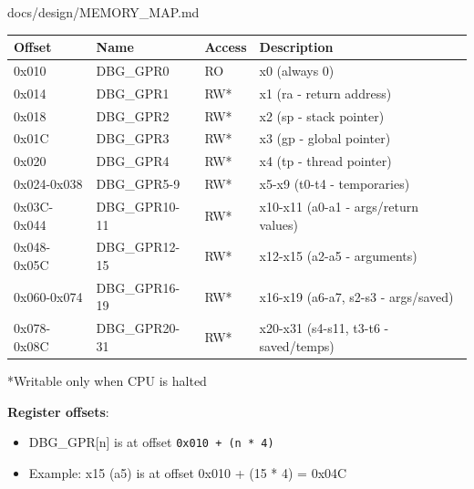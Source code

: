 \begin{relocated}{docs/design/MEMORY_MAP.md}
{
\begin{longtable}[]{@{}
  >{\centering\arraybackslash}p{}
  >{\centering\arraybackslash}p{}
  >{\centering\arraybackslash}p{}
  >{\centering\arraybackslash}p{}@{}}
\toprule\noalign{}
\begin{minipage}[b]{\linewidth}\centering
Offset
\end{minipage} & \begin{minipage}[b]{\linewidth}\centering
Name
\end{minipage} & \begin{minipage}[b]{\linewidth}\centering
Access
\end{minipage} & \begin{minipage}[b]{\linewidth}\centering
Description
\end{minipage} \\
\midrule\noalign{}
\endhead
\bottomrule\noalign{}
\endlastfoot
0x010 & DBG\_GPR0 & RO & x0 (always 0) \\
0x014 & DBG\_GPR1 & RW* & x1 (ra - return address) \\
0x018 & DBG\_GPR2 & RW* & x2 (sp - stack pointer) \\
0x01C & DBG\_GPR3 & RW* & x3 (gp - global pointer) \\
0x020 & DBG\_GPR4 & RW* & x4 (tp - thread pointer) \\
0x024-0x038 & DBG\_\allowbreak{}GPR5-9 & RW* & x5-x9 (t0-t4 -
temporaries) \\
0x03C-0x044 & DBG\_\allowbreak{}GPR10-11 & RW* & x10-x11 (a0-a1 -
args/\allowbreak{}return values) \\
0x048-0x05C & DBG\_\allowbreak{}GPR12-15 & RW* & x12-x15 (a2-a5 -
arguments) \\
0x060-0x074 & DBG\_\allowbreak{}GPR16-19 & RW* & x16-x19 (a6-a7, s2-s3 -
args/\allowbreak{}saved) \\
0x078-0x08C & DBG\_\allowbreak{}GPR20-31 & RW* & x20-x31 (s4-s11, t3-t6
- saved/\allowbreak{}temps) \\
\end{longtable}
}

*Writable only when CPU is halted

\textbf{Register offsets}:

\begin{itemize}
\tightlist
\item
  DBG\_\allowbreak{}GPR{[}n{]} is at offset
  \texttt{0x010\ +\allowbreak{}\ (n\ *\ 4)}
\item
  Example: x15 (a5) is at offset 0x010 + (15 * 4) = 0x04C
\end{itemize}


\end{relocated}
